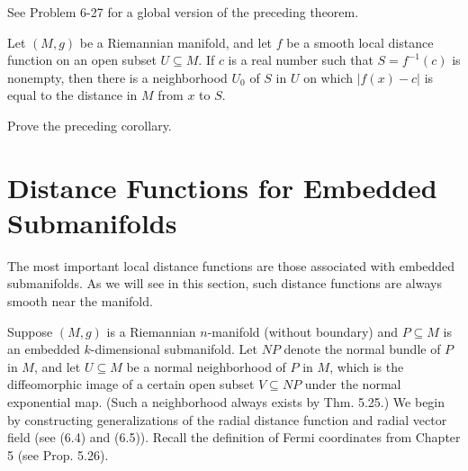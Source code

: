 See Problem 6-27 for a global version of the preceding theorem.

\begin{corollary}
\label{cor:local-distance-smooth-level-sets}

Let $(M,g)$ be a Riemannian manifold, and let $f$ be a smooth local distance function on an open subset $U \subseteq M$. If $c$ is a real number such that $S = f^{-1}(c)$ is nonempty, then there is a neighborhood $U_0$ of $S$ in $U$ on which $|f(x) - c|$ is equal to the distance in $M$ from $x$ to $S$.
\end{corollary}

\begin{exercise}
\label{exer:prove-local-distance-corollary}

Prove the preceding corollary.
\end{exercise}

\section{Distance Functions for Embedded Submanifolds}

The most important local distance functions are those associated with embedded submanifolds. As we will see in this section, such distance functions are always smooth near the manifold.

Suppose $(M,g)$ is a Riemannian $n$-manifold (without boundary) and $P \subseteq M$ is an embedded $k$-dimensional submanifold. Let $NP$ denote the normal bundle of $P$ in $M$, and let $U \subseteq M$ be a normal neighborhood of $P$ in $M$, which is the diffeomorphic image of a certain open subset $V \subseteq NP$ under the normal exponential map. (Such a neighborhood always exists by Thm. 5.25.) We begin by constructing generalizations of the radial distance function and radial vector field (see (6.4) and (6.5)). Recall the definition of Fermi coordinates from Chapter 5 (see Prop. 5.26).

